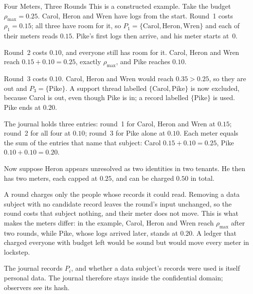 \begin{pdexample}{Four Meters, Three Rounds}
\setlength{\parskip}{4pt plus 1pt}
This is a constructed example. Take the budget $\rho_{\max}=0.25$. Carol, Heron and Wren
have logs from the start. Round~1 costs $\rho_1=0.15$; all three have room
for it, so $P_1=\{\text{Carol},\text{Heron},\text{Wren}\}$ and each of their
meters reads $0.15$. Pike's first logs then arrive, and his meter starts
at~$0$.

Round~2 costs $0.10$, and everyone still has room for it. Carol, Heron and Wren reach
$0.15+0.10=0.25$, exactly $\rho_{\max}$, and Pike reaches $0.10$.

Round~3 costs $0.10$. Carol, Heron and Wren would reach $0.35>0.25$, so they are
out and $P_3=\{\text{Pike}\}$. A support thread labelled
$\{\text{Carol},\text{Pike}\}$ is now excluded, because Carol is out, even
though Pike is in; a record labelled $\{\text{Pike}\}$ is used. Pike ends
at $0.20$.

The journal holds three entries: round~1 for Carol, Heron and Wren at $0.15$;
round~2 for all four at $0.10$; round~3 for Pike alone at $0.10$. Each meter
equals the sum of the entries that name that subject: Carol
$0.15+0.10=0.25$, Pike $0.10+0.10=0.20$.

Now suppose Heron appears unresolved as two identities in two tenants. He then
has two meters, each capped at $0.25$, and can be charged $0.50$ in total.
\end{pdexample}

A round charges only the people whose records it could read. Removing a data subject
with no candidate record leaves the round's input unchanged, so the round costs
that subject nothing, and their meter does not move. This is what makes the
meters differ: in the example, Carol, Heron and Wren reach $\rho_{\max}$ after two
rounds, while Pike, whose logs arrived later, stands at $0.20$. A ledger that charged
everyone with budget left would be sound but would move every meter in
lockstep.

The journal records $P_i$, and whether a data subject's records were used is itself
personal data. The journal therefore stays inside the confidential domain;
observers see its hash.

